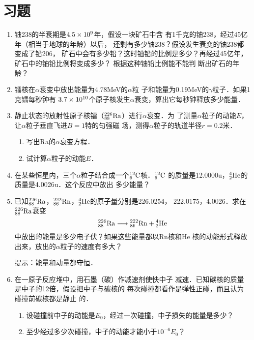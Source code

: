 \section*{习题}
\begin{enumerate}
    \item 铀238的半衰期是$4.5\x 10^9$年，假设一块矿石中含
有1千克的铀238，经过45亿年（相当于地球的年龄）以后，
还剩有多少铀238？假设发生衰变的铀238都变成了铅206，
矿石中会有多少铅？这时铀铅的比例是多少？再经过45亿年，
矿石中的铀铅比例将变成多少？ 根据这种铀铅比例能不能判
断出矿石的年龄？
\item 镭核在$\alpha$衰变中放出能量为4.78MeV的$\alpha$粒
子和能量为0.19MeV的$\gamma$粒子．如果1克镭每秒钟有
$3.7\x10^{10}$个原子核发生$\alpha$衰变，算出它每秒钟释放多少能量．
\item 静止状态的放射性原子核镭（$\atom{Ra}{226}{88}$）进行$\alpha$衰变．为
了测量$\alpha$粒子的动能$E$，让$\alpha$粒子垂直飞进$B=1$特的匀强磁
场，测得$\alpha$粒子的轨道半径$r=0.2$米．
\begin{enumerate}
    \item 写出Ra的$\alpha$衰变方程．
    \item 试计算$\alpha$粒子的动能$E$．
\end{enumerate}

\item 在某些恒星内，三个$\alpha$粒子结合成一个$\atom{C}{12}{6}$核．$\atom{C}{12}{6}$
的质量是12.0000u，$\atom{He}{4}{2}$的质量是4.0026u．这个反应中放出
多少能量？
\item 已知$\atom{Ra}{226}{88}$，$\atom{Rn}{222}{86}$，$\atom{He}{4}{2}$的原子量分别是226.0254，
222.0175，4.0026．求在$\atom{Ra}{226}{88}$衰变
\[\atom{Ra}{226}{88}\longrightarrow \atom{Rn}{222}{86}+\atom{He}{4}{2}\]
中放出的能量是多少电子伏？如果这些能量都以Rn核和He
核的动能形式释放出来，放出的$\alpha$粒子的速度有多大？

提示：能量和动量都守恒．

\item 在一原子反应堆中，用石墨（碳）作减速剂使快中子
减速．已知碳核的质量是中子的12倍，假设把中子与碳核的
每次碰撞都看作是弹性正碰，而且认为碰撞前碳核都是静止
的．
\begin{enumerate}
    \item 设碰撞前中子的动能是$E_0$，经过一次碰撞，中子损失的能量是多少？
    \item 至少经过多少次碰撞，中子的动能才能小于$10^{-6}E_0$？
\end{enumerate}

\end{enumerate}


































